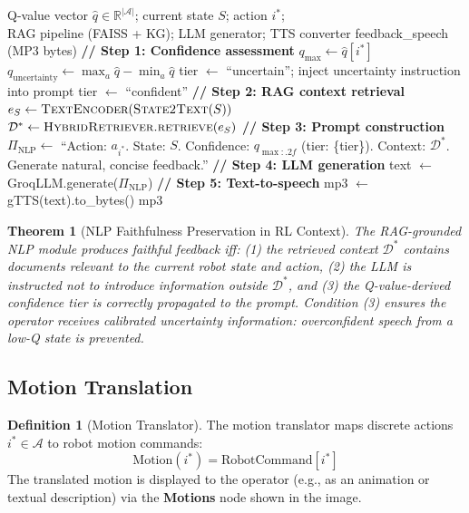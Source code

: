 \documentclass[12pt,a4paper]{article}
\theoremstyle{definition}
\newtheorem{definition}{Definition}[section]
\theoremstyle{plain}
\newtheorem{theorem}{Theorem}[section]
\theoremstyle{remark}
\newcommand{\R}{\mathbb{R}}
\begin{document}
\begin{algorithm}[H]
\caption{NLP Feedback Generation}
\label{alg:nlp_feedback}
\begin{algorithmic}[1]
\Require Q-value vector $\hat{q} \in \R^{|\mathcal{A}|}$; current state $S$; action $i^*$;\\
         RAG pipeline (FAISS + KG); LLM generator; TTS converter
\Ensure feedback\_speech (MP3 bytes)
\State \textbf{// Step 1: Confidence assessment}
\State $q_{\max} \gets \hat{q}[i^*]$ 
\State $q_{\text{uncertainty}} \gets \max_{a} \hat{q} - \min_a \hat{q}$ 
  \State tier $\gets$ ``uncertain''; inject uncertainty instruction into prompt
\Else
  \State tier $\gets$ ``confident''
\EndIf
\State \textbf{// Step 2: RAG context retrieval}
\State $e_S \gets \textsc{TextEncoder}(\textsc{State2Text}(S))$ 
\State $\mathcal{D}^* \gets \textsc{HybridRetriever.retrieve}(e_S)$ 
\State \textbf{// Step 3: Prompt construction}
\State $\Pi_{\text{NLP}} \gets$
  ``Action: $a_{i^*}$. State: $S$. Confidence: $q_{\max:.2f}$ (tier: \{tier\}).
   Context: $\mathcal{D}^*$. Generate natural, concise feedback.''
\State \textbf{// Step 4: LLM generation}
\State text $\gets$ GroqLLM.generate($\Pi_{\text{NLP}}$) 
\State \textbf{// Step 5: Text-to-speech}
\State mp3 $\gets$ gTTS(text).to\_bytes() 
\State \Return mp3
\end{algorithmic}
\end{algorithm}

\begin{theorem}[NLP Faithfulness Preservation in RL Context]
The RAG-grounded NLP module produces faithful feedback iff: (1) the retrieved context $\mathcal{D}^*$ contains documents relevant to the current robot state and action, (2) the LLM is instructed not to introduce information outside $\mathcal{D}^*$, and (3) the Q-value-derived confidence tier is correctly propagated to the prompt. Condition (3) ensures the operator receives calibrated uncertainty information: overconfident speech from a low-Q state is prevented.
\end{theorem}

\subsection{Motion Translation}
\label{sec:motions}

\begin{definition}[Motion Translator]
The motion translator maps discrete actions $i^* \in \mathcal{A}$ to robot motion commands:
\[
  \text{Motion}(i^*) = \text{RobotCommand}[i^*]
\]
The translated motion is displayed to the operator (e.g., as an animation or textual description) via the \textbf{Motions} node shown in the image.
\end{definition}
\end{document}
